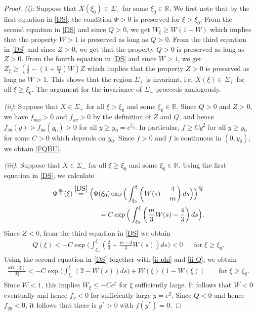 \documentclass{article}%
\newcommand{\R}{\mathbb{R}}
\begin{document}
\begin{proof} %
  {\it (i)}: Suppose that $X(\xi_0) \in \Sigma_+$ for some $\xi_0 \in \R$. 
We first note that by the first equation in \eqref{DS}, the condition 
$\Phi > 0$ is preserved for $\xi > \xi_0$. From the second equation in
 \eqref{DS} and since $Q > 0$, we get $W_\xi \geq W(1-W)$ which implies that
 the property $W > 1$ is preserved as long as $Q>0$. From the third equation in 
\eqref{DS} and since $Z > 0$, we get that the property $Q > 0$ is preserved as
 long as $Z > 0$. From the fourth equation in \eqref{DS} and
 since $W>1$, we get $Z_\xi \geq (\frac 13 -(1+ \frac m3)W)Z$ which implies
 that the property $Z> 0$ is preserved as long as $W>1$. This shows that the
 region $\Sigma_+$ is invariant, i.e. $X(\xi) \in \Sigma_+$ for all
 $\xi \geq \xi_0$. The argument for the invariance of $\Sigma_-$ proceeds analogously.

  \medskip

  {\it (ii)}: Suppose that $X \in \Sigma_+$ for all $\xi > \xi_0$ and some 
$\xi_0 \in \R$. Since $Q>0$ and $Z>0$, we have $f_{yyy}>0$ and $f_{yy}>0$
 by the definition of $Z$ and $Q$, and hence $f_{yy}(y)>f_{yy}(y_0) > 0$ for
 all $y\geq y_0 = e^{\xi_0}$. In particular, $f \geq C y^2$ for all
 $y \geq y_0$ for some $C > 0$ which depends on $y_0$. Since $f > 0$ and
 $f$ is continuous in $(0,y_0)$, we obtain \eqref{FQBU}.

  \medskip
  
 {\it (iii)}: Suppose that $X\in\Sigma_-$ for all $\xi \geq \xi_0$ and some
 $\xi_0 \in \R$. Using the first equation in \eqref{DS}, we calculate
\begin{align} \label{ii-phi} %
    \Phi^{\frac m3}(\xi) %
    \stackrel{\eqref{DS}}= \Big(\Phi(\xi_0) \exp \Big(\int_{\xi_0}^\xi \left(W(s)-\frac 4m\right)ds \Big) \Big)^{\frac m3} %
  \\  = C \exp \Big( \int_{\xi_0}^\xi \left(\frac m3 W(s)-\frac 43\right)ds \Big).
\end{align}
  Since $Z<0$, from the third equation in \eqref{DS} we obtain
 \begin{align} \label{ii-Q} %
    Q(\xi)<-C \exp \Big( \int_{\xi_0}^\xi \left(\frac 23 + \frac {m-3}3 W(s) \right)ds \Big) < 0 &&\text{for $\xi\geq \xi_0$}.
 \end{align}
  Using the second equation in \eqref{DS} together with \eqref{ii-phi} and \eqref{ii-Q}, we obtain
  \begin{align*}
    \frac{dW(\xi)}{d\xi} < -C \exp \Big(\int_{\xi_0}^\xi (2-W(s))ds \Big) +W(\xi)(1-W(\xi)) && \text{ for $\xi\geq\xi_0$}.
  \end{align*}
  Since $W<1$, this implies $W_\xi \leq -Ce^{\xi}$ for $\xi$ sufficiently
  large. It follows that $W < 0$ eventually and hence $f_y <0$ for sufficiently
  large $y = e^\xi$. Since $Q < 0$ and hence $f_{yy} < 0$, it follows that
  there is $y^* > 0$ with $f(y^*) = 0$.
\end{proof}
\end{document}
